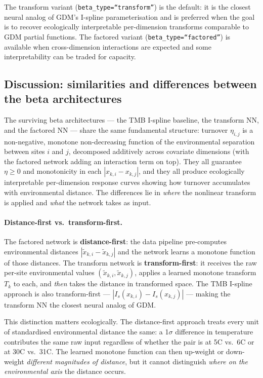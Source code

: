 \documentclass{article}
\begin{document}
The transform variant (\texttt{beta\_type=``transform''}) is the default: it is the closest neural analog of GDM's I-spline parameterisation and is preferred when the goal is to recover ecologically interpretable per-dimension transforms comparable to GDM partial functions. The factored variant (\texttt{beta\_type=``factored''}) is available when cross-dimension interactions are expected and some interpretability can be traded for capacity.

\subsection{Discussion: similarities and differences between the beta architectures}
\label{sec:beta-discussion}

The surviving beta architectures --- the TMB I-spline baseline, the transform NN, and the factored NN --- share the same fundamental structure: turnover $\eta_{i,j}$ is a non-negative, monotone non-decreasing function of the environmental separation between sites $i$ and $j$, decomposed additively across covariate dimensions (with the factored network adding an interaction term on top). They all guarantee $\eta \geq 0$ and monotonicity in each $|x_{k,i} - x_{k,j}|$, and they all produce ecologically interpretable per-dimension response curves showing how turnover accumulates with environmental distance. The differences lie in \emph{where} the nonlinear transform is applied and \emph{what} the network takes as input.

\paragraph{Distance-first vs.\ transform-first.}
The factored network is \textbf{distance-first}: the data pipeline pre-computes environmental distances $|\tilde{x}_{k,i} - \tilde{x}_{k,j}|$ and the network learns a monotone function of those distances. The transform network is \textbf{transform-first}: it receives the raw per-site environmental values $(\tilde{x}_{k,i}, \tilde{x}_{k,j})$, applies a learned monotone transform $T_k$ to each, and \emph{then} takes the distance in transformed space. The TMB I-spline approach is also transform-first --- $|I_s(x_{k,i}) - I_s(x_{k,j})|$ --- making the transform NN the closest neural analog of GDM.

This distinction matters ecologically. The distance-first approach treats every unit of standardised environmental distance the same: a 1$\sigma$ difference in temperature contributes the same raw input regardless of whether the pair is at 5\textdegree C vs.\ 6\textdegree C or at 30\textdegree C vs.\ 31\textdegree C. The learned monotone function can then up-weight or down-weight \emph{different magnitudes of distance}, but it cannot distinguish \emph{where on the environmental axis} the distance occurs.
\end{document}
